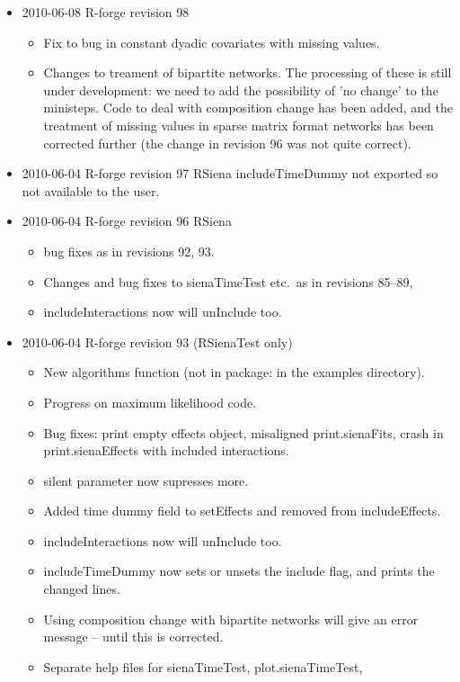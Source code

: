 \documentclass[a4paper,fleqn]{article}
\newcommand{\+}{\, + \,}
\newcommand{\sfn}[1]{\textsf{#1}}
\begin{document}
{\begin{itemize}
Fix to bug introduced in revision 98: bipartite networks could not have 'loops'
\item 2010-06-08 R-forge revision 98
\begin{itemize}
\item Fix to bug in constant dyadic covariates with missing values.
\item Changes to treament of bipartite networks. The processing of these is
  still under development: we need to add the possibility of 'no change' to the
  ministeps. Code to deal with composition change has been added, and the
  treatment of missing values in sparse matrix format networks has been
  corrected further (the change in revision 96 was not quite correct).
\end{itemize}
\item 2010-06-04 R-forge revision 97 RSiena includeTimeDummy not exported so not
  available to the user.
\item 2010-06-04 R-forge revision 96 RSiena
\begin{itemize}
\item bug fixes as in revisions 92, 93.
\item Changes and bug fixes to sienaTimeTest etc.\ as in revisions 85--89,
\item \sfn{includeInteractions} now will unInclude too.
\end{itemize}
\item 2010-06-04 R-forge revision 93 (RSienaTest only)
\begin{itemize}\item New algorithms function
  (not in package: in the examples directory).
\item Progress on maximum likelihood code.
\item Bug fixes: print empty effects object, misaligned print.sienaFits, crash
  in print.sienaEffects with included interactions.
\item silent parameter now supresses more.
\item Added time dummy field to \sfn{setEffects} and removed from
\sfn{includeEffects}.
\item \sfn{includeInteractions} now will unInclude too.
\item \sfn{includeTimeDummy} now sets or unsets the include flag, and prints the
  changed lines.
\item Using composition change with bipartite networks will give an error
  message -- until this is corrected.
\item Separate help files for sienaTimeTest, plot.sienaTimeTest,

\end{itemize}
\end{itemize}}
\end{document}
